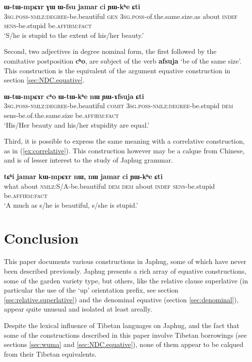 \documentclass[oneside,a4paper,11pt]{article}
\newcommand{\ipa}[1]{{\phon\textbf{#1}}}
\newcommand{\forme}[2]{\ipa{#1} `#2'}
\begin{document}
\begin{exe}
\ex 
\gll 
\ipa{ɯ-tɯ-mpɕɤr} \ipa{ɣɯ} 	\ipa{ɯ-fsu} 	\ipa{jamar} 	\ipa{ci} 	\ipa{ɲɯ-kʰe} 	\ipa{ɕti} \\
\textsc{3sg.poss-nmlz:degree}-be.beautiful \textsc{gen} \textsc{3sg.poss}-of.the.same.size.as about \textsc{indef} \textsc{sens}-be.stupid be.\textsc{affirm:fact} \\
\glt `S/he is stupid to the extent of his/her beauty.'
\end{exe}

Second, two adjectives in degree nominal form, the first followed by the comitative postposition \ipa{cʰo}, are subject of the verb \forme{afsuja}{be of the same size}. This construction is the equivalent of the argument equative construction in section \ref{sec:NDC.equative}.

\begin{exe}
\ex \label{ex:YAfsuja}
\gll 
\ipa{ɯ-tɯ-mpɕɤr} 	\ipa{cʰo} 	\ipa{ɯ-tɯ-kʰe} 	\ipa{nɯ} 	\ipa{ɲɯ-ɤfsuja} 	\ipa{ɕti} \\
\textsc{3sg.poss-nmlz:degree}-be.beautiful \textsc{comit} \textsc{3sg.poss-nmlz:degree}-be.stupid \textsc{dem} sens-be.of.the.same.size be.\textsc{affirm:fact} \\
\glt `His/Her beauty and his/her stupidity are equal.'
\end{exe}

Third, it is possible to express the same meaning with a correlative construction, as in (\ref{ex:correlative}). This construction however may be a calque from Chinese, and is of lesser interest to the study of Japhug grammar.

\begin{exe}
\ex \label{ex:correlative}
\gll 
\ipa{tɕʰi} 	\ipa{jamar} 	\ipa{kɯ-mpɕɤr} 	\ipa{nɯ,} 	\ipa{nɯ} 	\ipa{jamar} 	\ipa{ci} 	\ipa{ɲɯ-kʰe} 	\ipa{ɕti} \\
what about \textsc{nmlz}:S/A-be.beautiful \textsc{dem} \textsc{dem} about \textsc{indef} \textsc{sens}-be.stupid be.\textsc{affirm:fact} \\
\glt `A much as s/he is beautiful, s/she is stupid.'
\end{exe}



\section*{Conclusion}
This paper documents various constructions in Japhug, some of which have never been described previously. Japhug presents a rich array of equative constructions, some of the garden variety type, but others, like the relative clause superlative (in particular the use of the `up' orientation prefix, see section \ref{sec:relative.superlative}) and the denominal equative (section \ref{sec:denominal}), appear quite unusual and isolated at least areally.

Despite the lexical influence of Tibetan languages on Japhug, and the fact that some of the constructions described in this paper involve Tibetan borrowings (see sections \ref{sec:wuma} and \ref{sec:NDC.equative}), none of them appear to be calqued from their Tibetan equivalents.



\end{document}

